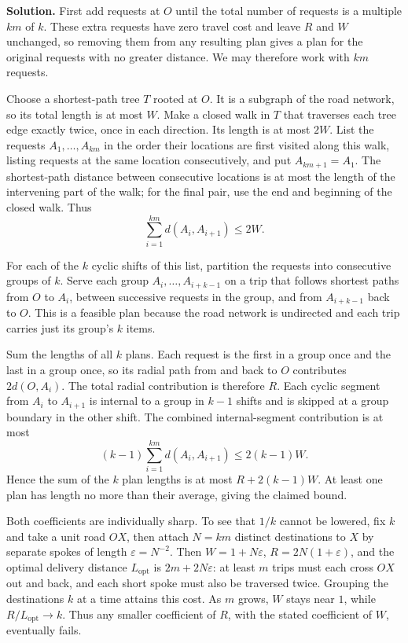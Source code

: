 \textbf{Solution.} First add requests at $O$ until the total number of requests is a multiple $km$ of $k$. These extra requests have zero travel cost and leave $R$ and $W$ unchanged, so removing them from any resulting plan gives a plan for the original requests with no greater distance. We may therefore work with $km$ requests.

Choose a shortest-path tree $T$ rooted at $O$. It is a subgraph of the road network, so its total length is at most $W$. Make a closed walk in $T$ that traverses each tree edge exactly twice, once in each direction. Its length is at most $2W$. List the requests $A_1,\ldots,A_{km}$ in the order their locations are first visited along this walk, listing requests at the same location consecutively, and put $A_{km+1}=A_1$. The shortest-path distance between consecutive locations is at most the length of the intervening part of the walk; for the final pair, use the end and beginning of the closed walk. Thus
\[
\sum_{i=1}^{km} d(A_i,A_{i+1})\leq 2W.
\]

For each of the $k$ cyclic shifts of this list, partition the requests into consecutive groups of $k$. Serve each group $A_i,\ldots,A_{i+k-1}$ on a trip that follows shortest paths from $O$ to $A_i$, between successive requests in the group, and from $A_{i+k-1}$ back to $O$. This is a feasible plan because the road network is undirected and each trip carries just its group's $k$ items.

Sum the lengths of all $k$ plans. Each request is the first in a group once and the last in a group once, so its radial path from and back to $O$ contributes $2d(O,A_i)$. The total radial contribution is therefore $R$. Each cyclic segment from $A_i$ to $A_{i+1}$ is internal to a group in $k-1$ shifts and is skipped at a group boundary in the other shift. The combined internal-segment contribution is at most
\[
(k-1)\sum_{i=1}^{km}d(A_i,A_{i+1})\leq 2(k-1)W.
\]
Hence the sum of the $k$ plan lengths is at most $R+2(k-1)W$. At least one plan has length no more than their average, giving the claimed bound.

Both coefficients are individually sharp. To see that $1/k$ cannot be lowered, fix $k$ and take a unit road $OX$, then attach $N=km$ distinct destinations to $X$ by separate spokes of length $\varepsilon=N^{-2}$. Then $W=1+N\varepsilon$, $R=2N(1+\varepsilon)$, and the optimal delivery distance $L_{\mathrm{opt}}$ is $2m+2N\varepsilon$: at least $m$ trips must each cross $OX$ out and back, and each short spoke must also be traversed twice. Grouping the destinations $k$ at a time attains this cost. As $m$ grows, $W$ stays near $1$, while $R/L_{\mathrm{opt}}\to k$. Thus any smaller coefficient of $R$, with the stated coefficient of $W$, eventually fails.

